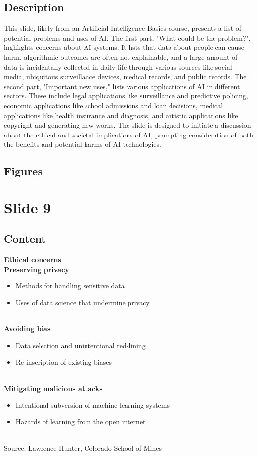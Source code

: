 \documentclass{article}%
\begin{document}
\subsection{Description}%
This slide, likely from an Artificial Intelligence Basics course, presents a list of potential problems and uses of AI.  The first part, "What could be the problem?", highlights concerns about AI systems.  It lists that data about people can cause harm, algorithmic outcomes are often not explainable, and a large amount of data is incidentally collected in daily life through various sources like social media, ubiquitous surveillance devices, medical records, and public records.  The second part, "Important new uses," lists various applications of AI in different sectors.  These include legal applications like surveillance and predictive policing, economic applications like school admissions and loan decisions, medical applications like health insurance and diagnosis, and artistic applications like copyright and generating new works.  The slide is designed to initiate a discussion about the ethical and societal implications of AI, prompting consideration of both the benefits and potential harms of AI technologies.%
\subsection{Figures}%
\begin{figure}[H]%
\centering%
\end{figure}

%
\newpage%
\section{Slide 9}%
\label{sec:Slide9}%
\subsection{Content}%

\textbf{Ethical concerns} \\
\textbf{Preserving privacy} \\
\begin{itemize}
    \item Methods for handling sensitive data
    \item Uses of data science that undermine privacy
\end{itemize} \\
\textbf{Avoiding bias} \\
\begin{itemize}
    \item Data selection and unintentional red-lining
    \item Re-inscription of existing biases
\end{itemize} \\
\textbf{Mitigating malicious attacks} \\
\begin{itemize}
    \item Intentional subversion of machine learning systems
    \item Hazards of learning from the open internet
\end{itemize} \\
Source: Lawrence Hunter, Colorado School of Mines
%
\end{document}

